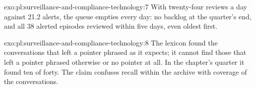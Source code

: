 \begin{solution}{exo:pl:surveillance-and-compliance-technology:7}
With twenty-four reviews a day against 21.2 alerts, the queue empties every day: no backlog at the quarter's end, and all 38 alerted episodes
reviewed within five days, even oldest first.
\end{solution}

\begin{solution}{exo:pl:surveillance-and-compliance-technology:8}
The lexicon found the conversations that left a pointer phrased as it expects; it cannot find those that left a pointer phrased otherwise or
no pointer at all. In the chapter's quarter it found ten of forty. The claim confuses recall within the archive with coverage of the
conversations.
\end{solution}

